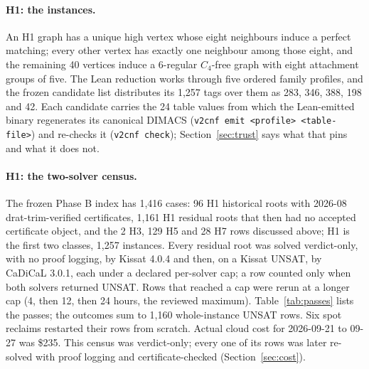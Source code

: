 \documentclass{anvil-paper}
\theoremstyle{definition}
\begin{document}
\paragraph{H1: the instances.} An H1 graph has a unique high vertex whose eight neighbours induce a perfect matching; every other vertex has exactly one neighbour among those eight, and the remaining 40 vertices induce a 6-regular $C_4$-free graph with eight attachment groups of five. The Lean reduction  works through five ordered family profiles, and the frozen candidate list distributes its 1,257 tags over them as 283, 346, 388, 198 and 42. Each candidate carries the 24 table values from which the Lean-emitted binary regenerates its canonical DIMACS (\texttt{v2cnf emit <profile> <table-file>}) and re-checks it (\texttt{v2cnf check}); Section~\ref{sec:trust} says what that pins and what it does not.

\paragraph{H1: the two-solver census.} The frozen Phase B index has 1,416 cases: 96 H1 historical roots with 2026-08 drat-trim-verified certificates, 1,161 H1 residual roots that then had no accepted certificate object, and the 2 H3, 129 H5 and 28 H7 rows discussed above; H1 is the first two classes, 1,257 instances. Every residual root was solved verdict-only, with no proof logging, by Kissat 4.0.4 and then, on a Kissat UNSAT, by CaDiCaL 3.0.1, each under a declared per-solver cap; a row counted only when both solvers returned UNSAT. Rows that reached a cap were rerun at a longer cap (4, then 12, then 24 hours, the reviewed maximum). Table~\ref{tab:passes} lists the passes; the outcomes sum to 1,160 whole-instance UNSAT rows. Six spot reclaims restarted their rows from scratch. Actual cloud cost for 2026-09-21 to 09-27 was \$235. This census was verdict-only; every one of its rows was later re-solved with proof logging and certificate-checked (Section~\ref{sec:cost}).
\end{document}
